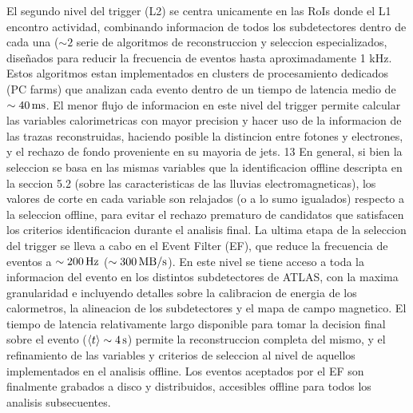 El segundo nivel del trigger (L2) se centra unicamente en las RoIs donde el L1
encontro actividad, combinando informacion de todos los subdetectores dentro de
cada una ($\sim 2$ %
serie de algoritmos de reconstruccion y seleccion especializados, dise\~nados
para reducir la frecuencia de eventos hasta aproximadamente 1 kHz. Estos
algoritmos estan implementados en clusters de procesamiento dedicados (PC farms)
que analizan cada evento dentro de un tiempo de latencia medio de $\sim
\unit[40]{ms}$. El menor flujo de informacion en este nivel del trigger permite
calcular las variables calorimetricas con mayor precision y hacer uso de la
informacion de las trazas reconstruidas, haciendo posible la distincion entre
fotones y electrones, y el rechazo de fondo proveniente en su mayoria de jets.
13 En general, si bien la seleccion se basa en las mismas variables que la
identificacion offline descripta en la seccion 5.2 (sobre las caracteristicas de
las lluvias electromagneticas), los valores de corte en cada variable son
relajados (o a lo sumo igualados) respecto a la seleccion offline, para evitar
el rechazo prematuro de candidatos que satisfacen los criterios identificacion
durante el analisis final. La ultima etapa de la seleccion del trigger se lleva
a cabo en el Event Filter (EF), que reduce la frecuencia de eventos a $\sim
\unit[200]{Hz}$ ($\sim \unit[300]{MB/s}$). En este nivel se tiene acceso a toda
la informacion del evento en los distintos subdetectores de ATLAS, con la maxima
granularidad e incluyendo detalles sobre la calibracion de energia de los
calormetros, la alineacion de los subdetectores y el mapa de campo magnetico. El
tiempo de latencia relativamente largo disponible para tomar la decision final
sobre el evento ($\avg{t} \sim \unit[4]{s}$) permite la reconstruccion completa
del mismo, y el refinamiento de las variables y criterios de seleccion al nivel
de aquellos implementados en el analisis offline. Los eventos aceptados por el
EF son finalmente grabados a disco y distribuidos, accesibles offline para todos
los analisis subsecuentes.

